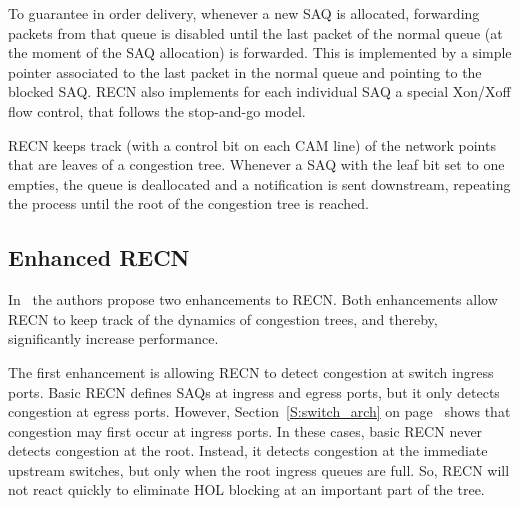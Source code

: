 \documentclass[12pt]{article}
\begin{document}
To guarantee in order delivery, whenever a new SAQ is allocated, forwarding packets from that queue is disabled until the last packet of the normal queue (at the moment of the SAQ allocation) is forwarded. This is implemented by a simple pointer associated to the last packet in the normal queue and pointing to the blocked SAQ. RECN also implements for each individual SAQ a special Xon/Xoff flow control, that follows the stop-and-go model. 

RECN keeps track (with a control bit on each CAM line) of the network points that are leaves of a congestion tree. Whenever a SAQ with the leaf bit set to one empties, the queue is deallocated and a notification is sent downstream, repeating the process until the root of the congestion tree is reached. 

\subsection{Enhanced RECN}\label{S:enhancedrecn}

In~\cite{paper2} the authors propose two enhancements to RECN. Both enhancements allow RECN to keep track of the dynamics of congestion trees, and thereby, significantly increase performance.

The first enhancement is allowing RECN to detect congestion at switch ingress ports. Basic RECN defines SAQs at ingress and egress ports, but it only detects congestion at egress ports. However, Section~\ref{S:switch_arch} on page~\pageref{S:switch_arch} shows that congestion may first occur at ingress ports. In these cases, basic RECN never detects congestion at the root. Instead, it detects congestion at the immediate upstream switches, but only when the root ingress queues are full. So, RECN will not react quickly to eliminate HOL blocking at an important part of the tree. 
\end{document}
